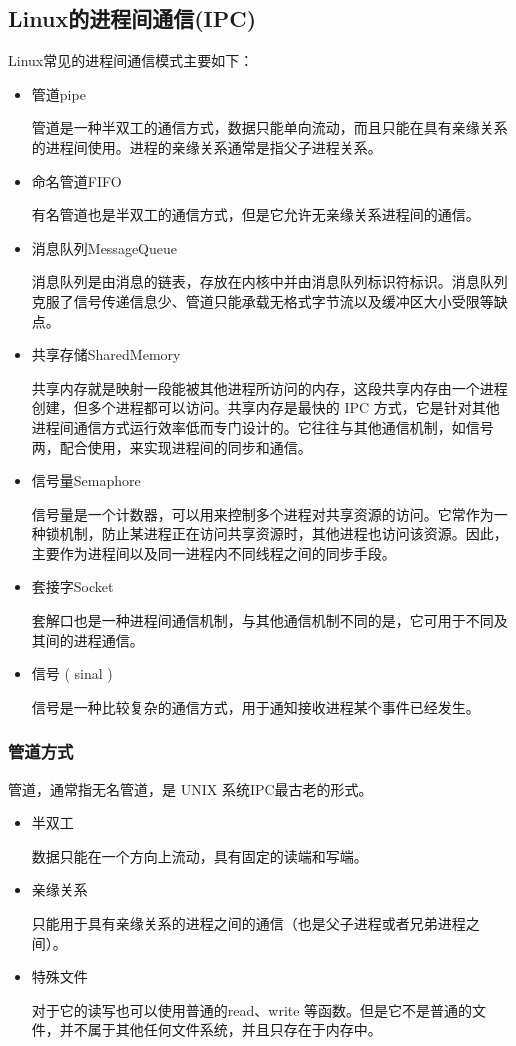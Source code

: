 \subsection{Linux的进程间通信(IPC)}
Linux常见的进程间通信模式主要如下：
\begin{itemize}
    \item 管道pipe

            管道是一种半双工的通信方式，数据只能单向流动，而且只能在具有亲缘关系的进程间使用。进程的亲缘关系通常是指父子进程关系。
    \item 命名管道FIFO

            有名管道也是半双工的通信方式，但是它允许无亲缘关系进程间的通信。
    \item 消息队列MessageQueue

            消息队列是由消息的链表，存放在内核中并由消息队列标识符标识。消息队列克服了信号传递信息少、管道只能承载无格式字节流以及缓冲区大小受限等缺点。
    \item 共享存储SharedMemory

            共享内存就是映射一段能被其他进程所访问的内存，这段共享内存由一个进程创建，但多个进程都可以访问。共享内存是最快的 IPC 方式，它是针对其他进程间通信方式运行效率低而专门设计的。它往往与其他通信机制，如信号两，配合使用，来实现进程间的同步和通信。
    \item 信号量Semaphore

            信号量是一个计数器，可以用来控制多个进程对共享资源的访问。它常作为一种锁机制，防止某进程正在访问共享资源时，其他进程也访问该资源。因此，主要作为进程间以及同一进程内不同线程之间的同步手段。
    \item 套接字Socket

            套解口也是一种进程间通信机制，与其他通信机制不同的是，它可用于不同及其间的进程通信。
    \item 信号 ( sinal )

            信号是一种比较复杂的通信方式，用于通知接收进程某个事件已经发生。
\end{itemize}

\subsubsection{管道方式}
管道，通常指无名管道，是 UNIX 系统IPC最古老的形式。
\begin{itemize}
    \item 半双工

            数据只能在一个方向上流动，具有固定的读端和写端。
    \item 亲缘关系

            只能用于具有亲缘关系的进程之间的通信（也是父子进程或者兄弟进程之间）。
    \item 特殊文件

            对于它的读写也可以使用普通的read、write 等函数。但是它不是普通的文件，并不属于其他任何文件系统，并且只存在于内存中。
\end{itemize}

